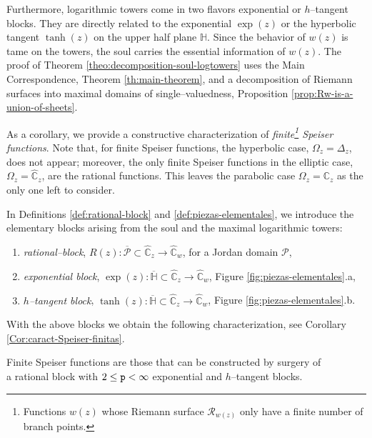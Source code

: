 \documentclass[final,3p,times]{elsarticle}
\newcommand{\CC}{\ensuremath{{\mathbb C}}}
\newcommand{\CW}{\ensuremath{{\widehat{\mathbb C}}}}
\newcommand{\HH}{\ensuremath{{\mathbb H}}}
\newcommand{\R}{\ensuremath{{\mathcal R}}}
\theoremstyle{definition}
\begin{document}
\smallskip 

\noindent 
Furthermore, logarithmic towers come in two flavors
exponential or $h$--tangent blocks. They are
directly related to the exponential $\exp(z)$
or the hyperbolic tangent $\tanh(z)$ on the upper half plane
$\HH$. 
Since the behavior of $w(z)$ is tame on the towers, 
the soul 
carries the essential information of $w(z)$. 
The proof of Theorem \ref{theo:decomposition-soul-logtowers}
uses the Main Correspondence, Theorem \ref{th:main-theorem}, 
and a decomposition of Riemann surfaces into 
maximal domains of single--valuedness, 
Proposition \ref{prop:Rw-is-a-union-of-sheets}.

\smallskip

As a corollary, we 
provide 
a constructive characterization of \emph{finite\footnote{
Functions $w(z)$ whose Riemann surface $\R_{w(z)}$ only have a finite number of branch points.} 
Speiser functions}.
Note 
that, for finite Speiser functions,
the hyperbolic case, 
$\Omega_z= \Delta_z$, does not appear;
moreover, the only finite Speiser functions in the elliptic case,
$\Omega_z= \CW_z$, are
the rational functions.
This leaves the parabolic case 
$\Omega_z= \CC_z$ as the only one left to 
consider.

\noindent
In Definitions \ref{def:rational-block} and \ref{def:piezas-elementales}, 
we introduce the elementary blocks arising from 
the soul and the maximal logarithmic towers:

\begin{enumerate}[label=\alph*),leftmargin=*]
\item 
\emph{rational--block}, 
$R(z): \overline{\mathscr{P}}\subset\CW_z\longrightarrow \CW_w$, 
for a Jordan domain $\mathscr{P}$,

\item 
\emph{exponential block}, 
$\exp(z): \overline{\HH}\subset\CW_z\longrightarrow\CW_w$,
Figure \ref{fig:piezas-elementales}.a,

\item 
\emph{$h$--tangent block}, 
$\tanh(z): \overline{\HH}\subset\CW_z \longrightarrow\CW_w$,
Figure \ref{fig:piezas-elementales}.b.
\end{enumerate}

\noindent 
With the above blocks we obtain the following characterization,
see Corollary \ref{Cor:caract-Speiser-finitas}. 

\smallskip

{\it 
\begin{center}
Finite Speiser functions 
are those that can be constructed by surgery of
\\
a rational block with 
$2\leq {\tt p} < \infty$
exponential and $h$--tangent blocks.
\end{center}
}
\end{document}
